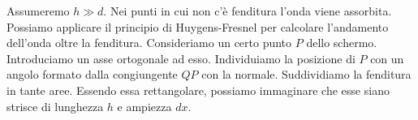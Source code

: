 \begin{figure}[htpb]
\end{figure}
\FloatBarrier

Assumeremo $h\gg d$.
Nei punti in cui non c'è fenditura l'onda viene assorbita. Possiamo applicare il principio di Huygens-Fresnel per calcolare l'andamento dell'onda oltre la fenditura.
Consideriamo un certo punto $P$ dello schermo. Introduciamo un asse ortogonale ad esso. Individuiamo la posizione di $P$ con un angolo formato dalla congiungente $QP$ con la normale. Suddividiamo la fenditura in tante aree. Essendo essa rettangolare, possiamo immaginare che esse siano strisce di lunghezza $h$ e ampiezza $dx$.

